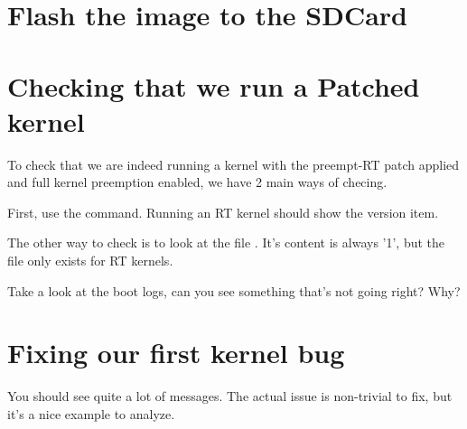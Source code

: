 \section{Flash the image to the SDCard}

\section{Checking that we run a Patched kernel}

To check that we are indeed running a kernel with the preempt-RT patch applied and
full kernel preemption enabled, we have 2 main ways of checing.

First, use the  command. Running an RT kernel should show the  version item.

The other way to check is to look at the file . It's content is always '1', but the file only exists for RT kernels.

Take a look at the boot logs, can you see something that's not going right? Why?

\section{Fixing our first kernel bug}

You should see quite a lot of  messages. The
actual issue is non-trivial to fix, but it's a nice example to analyze.

